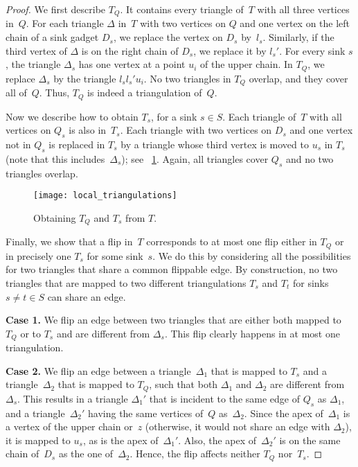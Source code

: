 \documentclass[a4paper,11pt]{article}
\begin{document}
\begin{proof}
We first describe $T_Q$.
It contains every triangle of~$T$ with all three vertices in~$Q$.
For each triangle $\Delta$ in~$T$ with two vertices on $Q$ and one vertex on the left chain of a sink gadget $D_s$, we replace the vertex on $D_s$ by~$l_s$.
Similarly, if the third vertex of $\Delta$ is on the right chain of $D_s$, we replace it by $l_s'$.
For every sink $s$, the triangle $\Delta_s$ has one vertex at a point $u_i$ of the upper chain.
In $T_Q$, we replace $\Delta_s$ by the triangle $l_s l_s' u_i$.
No two triangles in $T_Q$ overlap, and they cover all of~$Q$.
Thus, $T_Q$ is indeed a triangulation of~$Q$.

Now we describe how to obtain $T_s$, for a sink $s \in S$.
Each triangle of~$T$ with all vertices on $Q_s$ is also in~$T_s$. 
Each triangle with two vertices on $D_s$ and one vertex not in 
$Q_s$ is replaced in $T_s$ by a triangle whose 
third vertex is moved to
$u_s$ in $T_s$ (note that this includes~$\Delta_s$);
see \figurename~\ref{fig_local_triangulations}. Again, all triangles
cover $Q_s$ and no two triangles overlap.

\begin{figure}
\centering
\texttt{[image: local\_triangulations]}
\caption{Obtaining $T_Q$ and $T_s$ from $T$.}
\label{fig_local_triangulations}
\end{figure}

Finally, we show that a flip in~$T$ corresponds to at most one flip either in $T_Q$ or in precisely one $T_s$ for some sink~$s$.
We do this by considering all the possibilities for two triangles that share a common flippable edge.
By construction, no two triangles that are mapped to two different triangulations $T_s$ and $T_t$ for sinks $s \neq t \in S$ can share an edge.

\textbf{Case 1.}  We flip an edge between two triangles that are either both mapped to $T_Q$ or to $T_s$ and are different from $\Delta_s$.
This flip clearly happens in at most one triangulation.

\textbf{Case 2.} We flip an edge between a triangle~$\Delta_1$ that is mapped to $T_s$ and a triangle~$\Delta_2$ that is mapped to $T_Q$, such that both $\Delta_1$ and $\Delta_2$ are different from~$\Delta_s$.
This results in a triangle $\Delta_1'$ that is incident to the same edge of $Q_s$ as $\Delta_1$, and a triangle~$\Delta_2'$ having the same vertices of~$Q$
as~$\Delta_2$.
Since the apex of~$\Delta_1$ is a vertex of the upper chain or~$z$
(otherwise, it would not share an edge with $\Delta_2$), it is
mapped to $u_s$, as is the apex of~$\Delta_1'$.  Also, the apex of~$\Delta_2'$ is on
the same chain of~$D_s$ as the one of~$\Delta_2$.  Hence, the flip affects neither $T_Q$ nor~$T_s$.


\end{proof}
\end{document}
